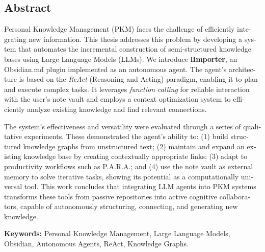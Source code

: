 \begin{otherlanguage}{english}    
\chapter*{Abstract}

Personal Knowledge Management (PKM) faces the challenge of efficiently integrating new information. This thesis addresses this problem by developing a system that automates the incremental construction of semi-structured knowledge bases using Large Language Models (LLMs). We introduce \textbf{lImporter}, an Obsidian.md plugin implemented as an autonomous agent. The agent's architecture is based on the \textit{ReAct} (Reasoning and Acting) paradigm, enabling it to plan and execute complex tasks. It leverages \textit{function calling} for reliable interaction with the user's note vault and employs a context optimization system to efficiently analyze existing knowledge and find relevant connections.

The system's effectiveness and versatility were evaluated through a series of qualitative experiments. These demonstrated the agent's ability to: (1) build structured knowledge graphs from unstructured text; (2) maintain and expand an existing knowledge base by creating contextually appropriate links; (3) adapt to productivity workflows such as P.A.R.A.; and (4) use the note vault as external memory to solve iterative tasks, showing its potential as a computationally universal tool. This work concludes that integrating LLM agents into PKM systems transforms these tools from passive repositories into active cognitive collaborators, capable of autonomously structuring, connecting, and generating new knowledge.

\vspace{1cm}
\textbf{Keywords:} Personal Knowledge Management, Large Language Models, Obsidian, Autonomous Agents, ReAct, Knowledge Graphs.

\end{otherlanguage}